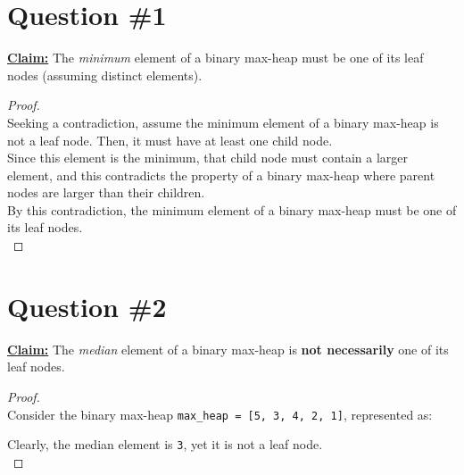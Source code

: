 \documentclass[12pt]{article}
\begin{document}
\renewcommand{\familydefault}{\rmdefault}



\pagebreak
\normalsize

\section*{Question \#1}
\textbf{\underline{Claim:}} The \textit{minimum} element of a binary max-heap must be one of its leaf nodes (assuming distinct elements).

\begin{proof}
\leavevmode\\
Seeking a contradiction, assume the minimum element of a binary max-heap is not a leaf node. Then, it must have at least one child node. \\
Since this element is the minimum, that child node must contain a larger element, and this contradicts the property of a binary max-heap where parent nodes are larger than their children. \\
By this contradiction, the minimum element of a binary max-heap must be one of its leaf nodes. \\
\end{proof}
\pagebreak

\section*{Question \#2}
\textbf{\underline{Claim:}} The \textit{median} element of a binary max-heap is \textbf{not necessarily} one of its leaf nodes.

\begin{proof}
\leavevmode\\
Consider the binary max-heap \texttt{max\_heap = [5, 3, 4, 2, 1]}, represented as:
\\
\begin{center}
\end{center}
Clearly, the median element is \texttt{3}, yet it is not a leaf node. \\
\end{proof}
\pagebreak
\end{document}
